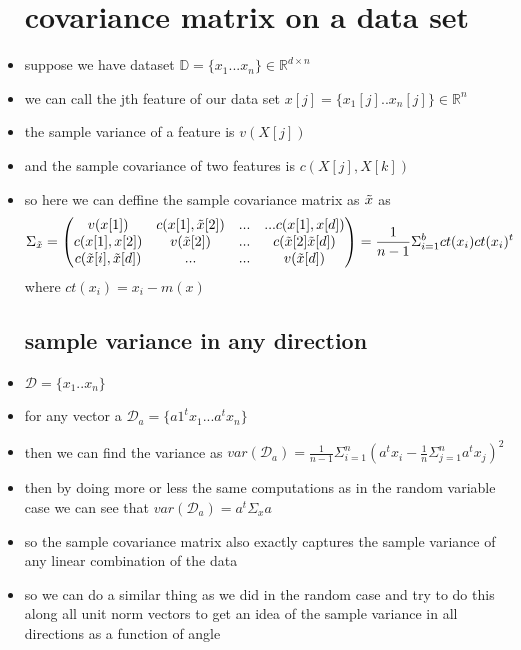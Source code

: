 \documentclass{article}
\begin{document}
\begin{itemize}
\section*{covariance matrix on a data set}
\item suppose we have dataset $\mathbb{D}=\{x_1...x_n\}\in \mathbb{R}^{d\times n}$
\item we can call the jth feature of our data set $x[j]=\{x_1[j]..x_n[j]\}\in \mathbb{R}^{n}$
\item the sample variance of a feature is  $v(X[j])$
\item and the sample covariance of two features is $c(X[j],X[k])$
\item so here we can deffine the sample covariance matrix as $\Tilde{x}$ as $$\Sigma_{\tilde{x}}=\begin{pmatrix}
    v({x}[1])&c({x}[1],\tilde{x}[2])&...&...c({x}[1],{x}[d])\\
    c({x}[1],{x}[2])& v(\Tilde{x}[2])&...&c(\Tilde{x}[2]\Tilde{x}[d])
    \\ c(\Tilde{x}[i],\tilde{x}[d])&...&... & v(\Tilde{x}[d])
\end{pmatrix}= \frac{1}{n-1}\Sigma_{i=1}^{b}ct(x_i)ct(x_i)^{t}$$ where $ct(x_i)=x_i-m(x)$
\subsection*{sample variance in any direction}
\item $\mathcal{D}=\{x_1..x_n\}$
\item for any vector a $\mathcal{D}_{a}=\{a1^tx_1...a^tx_n\}$
\item then we can find the variance as $var(\mathcal{D}_a)=\frac{1}{n-1}\Sigma_{i=1}^{n}(a^tx_i-\frac{1}{n}\Sigma_{j=1}^{n}a^tx_j)^2$
\item then by doing more or less the same computations as in the random variable case we can see that $var(\mathcal{D}_{a})=a^t \Sigma_{x}a$
\item so the sample covariance matrix also exactly captures the sample variance of any linear combination of the data 
\item so we can do a similar thing as we did in the random case and try to do this along all unit norm vectors to get an idea of the sample variance in all directions as a function of angle


\end{itemize}
\end{document}
